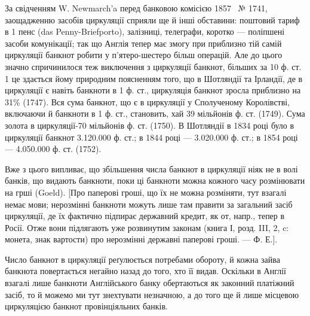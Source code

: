 За свідченням W. Newmarch’a перед банковою комісією 1857~ № 1741,
заощадженню засобів циркуляції сприяли ще й інші обставини: поштовий тариф
в 1 пенс (das Penny-Briefporto), залізниці, телеграфи, коротко — поліпшені засоби
комунікації; так що Англія тепер має змогу при приблизно тій самій циркуляції
банкнот робити у п’ятеро-шестеро більш операцій. Але до цього значно
спричинилося теж виключення з циркуляції банкнот, більших за 10 ф. ст. 1 це
здається йому природним поясненням того, що в Шотляндії та Ірландії, де в
циркуляції є навіть банкноти в 1 ф. ст., циркуляція банкнот зросла приблизно
на 31\% (1747). Вся сума банкнот, що є в циркуляції у Сполученому Королівстві,
включаючи й банкноти в 1 ф. ст., становить, хай 39 мільйонів ф. ст.
(1749). Сума золота в циркуляції-70 мільйонів ф. ст. (1750). В Шотляндії
в 1834 році було в циркуляції банкнот \num{3.120.000} ф. ст.; в 1844 році —
\num{3.020.000} ф. ст.; в 1854 році — \num{4.050.000} ф. ст. (1752).

Вже з цього випливає, що збільшення числа банкнот в циркуляції ніяк
не в волі банків, що видають банкноти, поки ці банкноти можна кожного часу
розмінювати на грші (Goeld). [Про паперові гроші, що їх не можна розміняти,
тут взагалі немає мови; нерозмінні банкноти можуть лише там правити за загальний
засіб циркуляції, де їх фактично підпирає державний кредит, як от, напр., тепер
в Росії. Отже вони підлягають уже розвинутим законам (книга І, розд. III, 2, c:
монета, знак вартости) про нерозмінні державні паперові гроші. — Ф. Е.].

Число банкнот в циркуляції реґулюється потребами обороту, й кожна
зайва банкнота повертається негайно назад до того, хто її видав. Оскільки в
Англії взагалі лише банкноти Англійського банку обертаються як законний
платіжний засіб, то й можемо ми тут знехтувати незначною, а до того ще й лише
місцевою циркуляцією банкнот провінціяльних банків.
